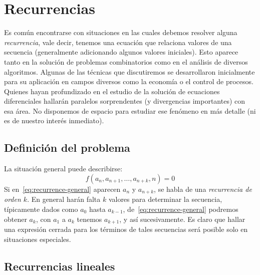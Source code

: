 %

\chapter{Recurrencias}
\label{sec:recurrencias}

  Es común encontrarse con situaciones
  en las cuales debemos resolver alguna \emph{recurrencia},
  vale decir,
  tenemos una ecuación que relaciona valores de una secuencia
  (generalmente adicionando algunos valores iniciales).
  Esto aparece tanto en la solución de problemas combinatorios
  como en el análisis de diversos algoritmos.
  Algunas de las técnicas que discutiremos
  se desarrollaron inicialmente
  para su aplicación en campos diversos como la economía
  o el control de procesos.
  Quienes hayan profundizado en el estudio
  de la solución de ecuaciones diferenciales
  hallarán paralelos sorprendentes
  (y divergencias importantes)
  con esa área.
  No disponemos de espacio
  para estudiar ese fenómeno en más detalle
  (ni es de nuestro interés inmediato).

\section{Definición del problema}
\label{sec:definicion-problema-recurrencia}

  La situación general puede describirse:
  \begin{equation}
    \label{eq:recurrence-general}
    f(a_n, a_{n + 1}, \dotsc, a_{n + k}, n)
      = 0
  \end{equation}
  Si en~\eqref{eq:recurrence-general} aparecen \(a_n\) y \(a_{n + k}\),
  se habla de una \emph{recurrencia de orden \(k\)}.%
  En general harán falta \(k\) valores para determinar la secuencia,
  típicamente dados como \(a_0\) hasta \(a_{k - 1}\),
  de~\eqref{eq:recurrence-general} podremos obtener \(a_k\),
  con \(a_1\) a \(a_k\) tenemos \(a_{k + 1}\),
  y así sucesivamente.
  Es claro que hallar una expresión cerrada
  para los términos de tales secuencias
  será posible solo en situaciones especiales.

\section{Recurrencias lineales}
\label{sec:recurrencias-lineales-teoria}

